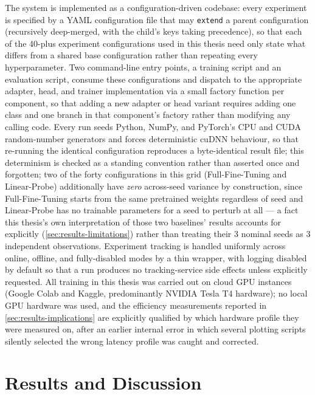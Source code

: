 \documentclass{iutbscthesis}
\begin{document}
The system is implemented as a configuration-driven codebase: every experiment is specified by a YAML configuration file that may \texttt{extend} a parent configuration (recursively deep-merged, with the child's keys taking precedence), so that each of the 40-plus experiment configurations used in this thesis need only state what differs from a shared base configuration rather than repeating every hyperparameter. Two command-line entry points, a training script and an evaluation script, consume these configurations and dispatch to the appropriate adapter, head, and trainer implementation via a small factory function per component, so that adding a new adapter or head variant requires adding one class and one branch in that component's factory rather than modifying any calling code. Every run seeds Python, NumPy, and PyTorch's CPU and CUDA random-number generators and forces deterministic cuDNN behaviour, so that re-running the identical configuration reproduces a byte-identical result file; this determinism is checked as a standing convention rather than asserted once and forgotten; two of the forty configurations in this grid (Full-Fine-Tuning and Linear-Probe) additionally have \emph{zero} across-seed variance by construction, since Full-Fine-Tuning starts from the same pretrained weights regardless of seed and Linear-Probe has no trainable parameters for a seed to perturb at all — a fact this thesis's own interpretation of those two baselines' results accounts for explicitly (\autoref{sec:results-limitations}) rather than treating their 3 nominal seeds as 3 independent observations. Experiment tracking is handled uniformly across online, offline, and fully-disabled modes by a thin wrapper, with logging disabled by default so that a run produces no tracking-service side effects unless explicitly requested. All training in this thesis was carried out on cloud GPU instances (Google Colab and Kaggle, predominantly NVIDIA Tesla T4 hardware); no local GPU hardware was used, and the efficiency measurements reported in \autoref{sec:results-implications} are explicitly qualified by which hardware profile they were measured on, after an earlier internal error in which several plotting scripts silently selected the wrong latency profile was caught and corrected.


\chapter{Results and Discussion}
\label{chapter:results}
\end{document}
